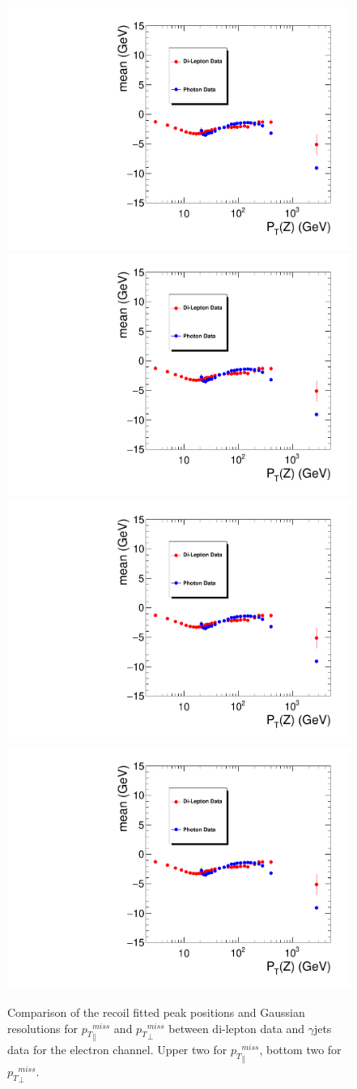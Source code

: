 \begin{figure}[htbp]
\begin{center}
\includegraphics[width=0.46\linewidth, page=1]{figures/plots_SingleEMU_Run2016Full_03Feb2017_allcorV2_met_para_study_ZSelecLowLPt_el_VS_SinglePhoton_Run2016Full_03Feb2017_allcorV2_NoRecoil_met_para_study_ZSelecLowLPt_el.pdf}
\includegraphics[width=0.46\linewidth, page=5]{figures/plots_SingleEMU_Run2016Full_03Feb2017_allcorV2_met_para_study_ZSelecLowLPt_el_VS_SinglePhoton_Run2016Full_03Feb2017_allcorV2_NoRecoil_met_para_study_ZSelecLowLPt_el.pdf}
\includegraphics[width=0.46\linewidth, page=3]{figures/plots_SingleEMU_Run2016Full_03Feb2017_allcorV2_met_para_study_ZSelecLowLPt_el_VS_SinglePhoton_Run2016Full_03Feb2017_allcorV2_NoRecoil_met_para_study_ZSelecLowLPt_el.pdf}
\includegraphics[width=0.46\linewidth, page=7]{figures/plots_SingleEMU_Run2016Full_03Feb2017_allcorV2_met_para_study_ZSelecLowLPt_el_VS_SinglePhoton_Run2016Full_03Feb2017_allcorV2_NoRecoil_met_para_study_ZSelecLowLPt_el.pdf}
\caption{Comparison of the recoil fitted peak positions and Gaussian resolutions for ${p_{T}}^{miss}_\parallel$ and ${p_{T}}^{miss}_\perp$ between di-lepton data and $\gamma$jets data for the electron channel. Upper two for 
${p_{T}}^{miss}_\parallel$, bottom two for ${p_{T}}^{miss}_\perp$.}
\label{fig:recoilfit_met_peak_reso_compare_data_gjets_el}
\end{center}
\end{figure}

